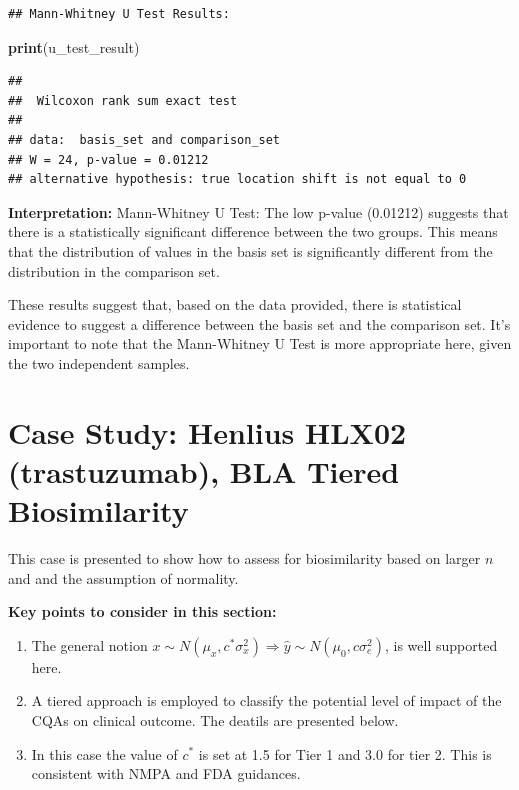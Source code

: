 \documentclass[
  12pt,
  a4paper,
]{article}
\newenvironment{Shaded}{\begin{snugshade}}{\end{snugshade}}
\newcommand{\FunctionTok}[1]{\textcolor[rgb]{0.13,0.29,0.53}{\textbf{#1}}}
\newcommand{\NormalTok}[1]{#1}
\providecommand{\tightlist}{%
  \setlength{\itemsep}{0pt}\setlength{\parskip}{0pt}}
\numberwithin{equation}{section}
\theoremstyle{plain}
\theoremstyle{definition}
\theoremstyle{remark}
\theoremstyle{note}
\begin{document}
\begin{verbatim}
## Mann-Whitney U Test Results:
\end{verbatim}

\begin{Shaded}
\begin{Highlighting}[]
\FunctionTok{print}\NormalTok{(u\_test\_result)}
\end{Highlighting}
\end{Shaded}

\begin{verbatim}
## 
##  Wilcoxon rank sum exact test
## 
## data:  basis_set and comparison_set
## W = 24, p-value = 0.01212
## alternative hypothesis: true location shift is not equal to 0
\end{verbatim}

\textbf{Interpretation:} Mann-Whitney U Test: The low p-value (0.01212)
suggests that there is a statistically significant difference between
the two groups. This means that the distribution of values in the basis
set is significantly different from the distribution in the comparison
set.

These results suggest that, based on the data provided, there is
statistical evidence to suggest a difference between the basis set and
the comparison set. It's important to note that the Mann-Whitney U Test
is more appropriate here, given the two independent samples.

\newpage

\hypertarget{case-study-henlius-hlx02-trastuzumab-bla-tiered-biosimilarity}{%
\section{Case Study: Henlius HLX02 (trastuzumab), BLA Tiered
Biosimilarity}\label{case-study-henlius-hlx02-trastuzumab-bla-tiered-biosimilarity}}

This case is presented to show how to assess for biosimilarity based on
larger \(n\) and and the assumption of normality.

\textbf{Key points to consider in this section:}

\begin{enumerate}
\def\labelenumi{\arabic{enumi}.}
\tightlist
\item
  The general notion
  \(x \sim N\left(\mu_x, c^* \sigma_x^2\right) \Longrightarrow \hat{y} \sim N\left(\mu_0, c \sigma_e^2\right)\),
  is well supported here.
\item
  A tiered approach is employed to classify the potential level of
  impact of the CQAs on clinical outcome. The deatils are presented
  below.
\item
  In this case the value of \(c^*\) is set at 1.5 for Tier 1 and 3.0 for
  tier 2. This is consistent with NMPA and FDA guidances.
\end{enumerate}
\end{document}
